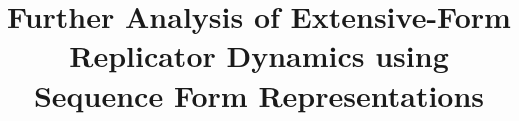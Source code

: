 \documentclass{aamas2014}
\begin{document}


\title{Further Analysis of Extensive-Form Replicator Dynamics using Sequence Form Representations}




%
%
%
%

%

\end{document}
